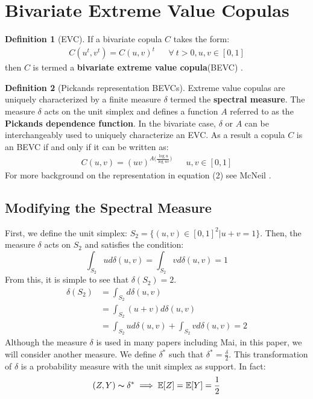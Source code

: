 \documentclass[12pt]{article}
\def\E{\mathbb{E}}
\newcommand{\ds}{\displaystyle}
\theoremstyle{definition}
\theoremstyle{definition}
\newtheorem{definition}{Definition}
\begin{document}
\section{Bivariate Extreme Value Copulas}
\begin{definition}[EVC]
If a bivariate copula $C$ takes the form:
\begin{align*}
    C(u^t,v^t)=C(u,v)^t && \forall \ t>0, u,v\in[0,1] 
\end{align*}
then $C$ is termed a \textbf{bivariate extreme value copula}(BEVC) \cite{bevcbook}.

\end{definition}
\begin{definition}[Pickands representation BEVCs]
Extreme value copulas are uniquely characterized by a finite measure $\delta$ termed the \textbf{spectral measure}\cite{bevcart}. The measure $\delta$ acts on the unit simplex and defines a function $A$ referred to as the \textbf{Pickands dependence function}\cite{bevcart}.  In the bivariate case, $\delta$ or $A$ can be interchangeably used to uniquely characterize an EVC. As a result a copula $C$ is an BEVC if and only if it can be written as:
\begin{align*}
    C(u,v)=(uv)^{A\big( \frac{\log u}{\log uv} \big)} && u,v\in[0,1]\tag{2}
\end{align*}
For more background on the representation in equation (2) see McNeil \cite{bevcbook}.
\end{definition}

\subsection{Modifying the Spectral Measure}
First, we define the unit simplex: $S_2=\{(u,v)\in [0,1]^2|u+v=1 \}$. Then, the measure $\delta$ acts on $S_2$ and satisfies the condition\cite{bevcart}:
$$\int_{S_2}ud\delta(u,v)=\int_{S_2}vd\delta(u,v)=1$$
From this, it is simple to see that $\delta(S_2)=2$.
\begin{align*}
    \delta(S_2)&=\int_{S_2}d\delta(u,v)\\
    &=\int_{S_2}(u+v)d\delta(u,v)\\
    &=\int_{S_2}ud\delta(u,v)+\int_{S_2}vd\delta(u,v)=2
\end{align*}
Although the measure $\delta$ is used in many papers including Mai\cite{bevcart}, in this paper, we will consider another measure. We define $\delta^*$ such that $\ds\delta^*=\frac{\delta}{2}$. This transformation of $\delta$ is a probability measure with the unit simplex as support. In fact: 
$$(Z,Y)\thicksim \delta^* \implies \E[Z]=\E[Y]=\frac{1}{2}$$
\end{document}
